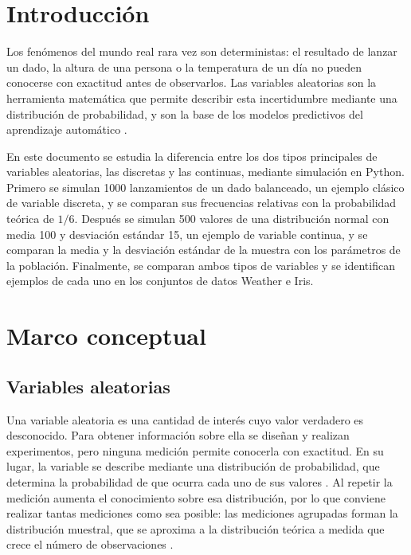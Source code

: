\documentclass[11pt,letterpaper]{article}
\begin{document}
\portada
\indicegeneral


\section{Introducción}

Los fenómenos del mundo real rara vez son deterministas: el resultado de lanzar un dado, la altura de una persona o la temperatura de un día no pueden conocerse con exactitud antes de observarlos. Las variables aleatorias son la herramienta matemática que permite describir esta incertidumbre mediante una distribución de probabilidad, y son la base de los modelos predictivos del aprendizaje automático \parencite{tecnm2026_documento_fuente,brownlee2020}.

En este documento se estudia la diferencia entre los dos tipos principales de variables aleatorias, las discretas y las continuas, mediante simulación en Python. Primero se simulan 1000 lanzamientos de un dado balanceado, un ejemplo clásico de variable discreta, y se comparan sus frecuencias relativas con la probabilidad teórica de $1/6$. Después se simulan 500 valores de una distribución normal con media 100 y desviación estándar 15, un ejemplo de variable continua, y se comparan la media y la desviación estándar de la muestra con los parámetros de la población. Finalmente, se comparan ambos tipos de variables y se identifican ejemplos de cada uno en los conjuntos de datos Weather e Iris.

\section{Marco conceptual}

\subsection{Variables aleatorias}

Una variable aleatoria es una cantidad de interés cuyo valor verdadero es desconocido. Para obtener información sobre ella se diseñan y realizan experimentos, pero ninguna medición permite conocerla con exactitud. En su lugar, la variable se describe mediante una distribución de probabilidad, que determina la probabilidad de que ocurra cada uno de sus valores \parencite{tecnm2026_documento_fuente,bonamente2017}. Al repetir la medición aumenta el conocimiento sobre esa distribución, por lo que conviene realizar tantas mediciones como sea posible: las mediciones agrupadas forman la distribución muestral, que se aproxima a la distribución teórica a medida que crece el número de observaciones \parencite{bonamente2017}.
\end{document}
